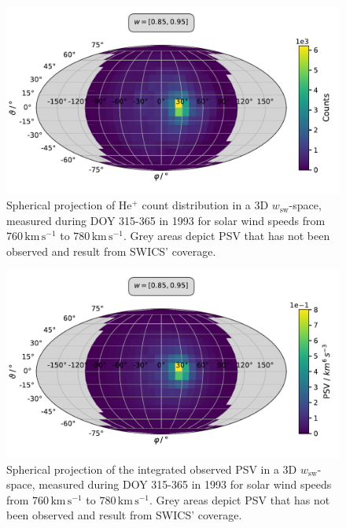\begin{figure}[h]
	\includegraphics[width=1\textwidth]{Figures/sky_counts.pdf}
	\centering
	\caption{Spherical projection of $\mathrm{He^{+}}$ count distribution in a 3D $w_\mathrm{sw}$-space, measured during DOY 315-365 in 1993 for solar wind speeds from $760 \, \mathrm{km\,s^{-1}}$ to $780 \, \mathrm{km\,s^{-1}}$. Grey areas depict PSV that has not been observed and result from SWICS' coverage.}
	\label{fig:sky_counts}
\end{figure}
\begin{figure}[h]
	\includegraphics[width=1\textwidth]{Figures/sky_norm.pdf}
	\centering
	\caption{Spherical projection of the integrated observed PSV in a 3D $w_\mathrm{sw}$-space, measured during DOY 315-365 in 1993 for solar wind speeds from $760 \, \mathrm{km\,s^{-1}}$ to $780 \, \mathrm{km\,s^{-1}}$. Grey areas depict PSV that has not been observed and result from SWICS' coverage.}
	\label{fig:sky_norm}
\end{figure}
